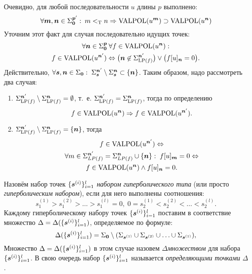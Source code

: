 \documentclass[14pt]{extarticle}
\begin{document}
Очевидно, для любой последовательности $u$ длины $p$ выполнено:
$$\forall \boldsymbol{m}, \boldsymbol{n} \in \Sigma_{\boldsymbol{0}}^{\boldsymbol{p}'}:\: m <_{\textrm T} n \Rightarrow
   \operatorname{VALPOL}(u^{\boldsymbol{m}}) \supset \operatorname{VALPOL}(u^{\boldsymbol{n}})$$
Уточним этот факт для случая последовательно идущих точек:
\begin{multline*}\label{RemainsInValpol}
   \forall \boldsymbol{n} \in \Sigma_{\boldsymbol{0}}^{\boldsymbol{p}} \: \forall f \in \operatorname{VALPOL}(u^{\boldsymbol{n}}):\\
      f \in \operatorname{VALPOL}(u^{\boldsymbol{n}'}) \Leftrightarrow
      \bigl(\boldsymbol{n} \not\in \Sigma_{\operatorname{LP}(f)}^{\boldsymbol{n}'}\bigr)
         \vee \bigl(f[u]_{\boldsymbol{n}}=0\bigr).
\end{multline*}
Действительно, $\forall \boldsymbol{s}, \boldsymbol{n} \in\Sigma_{\boldsymbol{0}}:\;\Sigma_{\boldsymbol{s}}^{\boldsymbol{n}'}\setminus
\Sigma_{\boldsymbol{s}}^{\boldsymbol{n}}\subset\{\boldsymbol{n}\}$. Таким образом, надо рассмотреть два
случая:
\begin{enumerate}
   \item $\Sigma_{\operatorname{LP}(f)}^{\boldsymbol{n}'}\setminus\Sigma_{\operatorname{LP}(f)}^{\boldsymbol{n}}=\emptyset$,
      т.~е. $\Sigma_{\operatorname{LP}(f)}^{\boldsymbol{n}'}=\Sigma_{\operatorname{LP}(f)}^{\boldsymbol{n}}$, тогда по
      определению
      $$f \in\operatorname{VALPOL}(u^{\boldsymbol{n}}) \Rightarrow f \in\operatorname{VALPOL}(u^{\boldsymbol{n}'}).$$

   \item $\Sigma_{\operatorname{LP}(f)}^{\boldsymbol{n}'}\setminus\Sigma_{\operatorname{LP}(f)}^{\boldsymbol{n}}=\{\boldsymbol{n}\}$,
      тогда
      \begin{multline}
      f\in\operatorname{VALPOL}(u^{\boldsymbol{n}'}) \Leftrightarrow\\
      \forall m\in \Sigma_{LP(f)}^{\boldsymbol{n}'}=\Sigma_{LP(f)}^{\boldsymbol{n}}\cup\{\boldsymbol{n}\}:
      \; f[u]_{\boldsymbol{m}}=0
      \Leftrightarrow\\f\in\operatorname{VALPOL}(u^{\boldsymbol{n}}) \wedge f[u]_{\boldsymbol{n}}=0.
      \end{multline}
\end{enumerate}


Назовём набор точек $\{\boldsymbol{s}^{(i)}\}_{i=1}^l$ {\em набором гиперболического
типа} (или просто {\em гиперболическим набором\/}), если для него выполнены
соотношения:
\begin{equation}\label{DeltaProp}
s_1^{(1)}>s_1^{(2)}>\ldots>s_1^{(l)}=0,\;0=s_2^{(1)}<s_2^{(2)}<\ldots<s_2^{(l)}.
\end{equation}
Каждому гиперболическому набору точек $\{\boldsymbol{s}^{(i)}\}_{i=1}^l$ поставим в
соответствие множество $\Delta=\Delta(\{\boldsymbol{s}^{(i)}\}_{i=1}^l)$, определяемое по
формуле:
$$\Delta(\{\boldsymbol{s}^{(i)}\}_{i=1}^l)=\Sigma_{\boldsymbol{0}}\setminus(\Sigma_{\boldsymbol{s}^{(1)}}\cup\Sigma_{\boldsymbol{s}^{(2)}}\cup\ldots\cup\Sigma_{\boldsymbol{s}^{(1)}}),
$$Множество $\Delta=\Delta(\{\boldsymbol{s}^{(i)}\}_{i=1}^l)$ в этом случае назовем
{\em$\Delta$\nbdash множеством} для набора $\{\boldsymbol{s}^{(i)}\}_{i=1}^l$. В свою
очередь набор $\{\boldsymbol{s}^{(i)}\}_{i=1}^l$ называется {\em определяющими точками}
$\Delta$.
\end{document}
